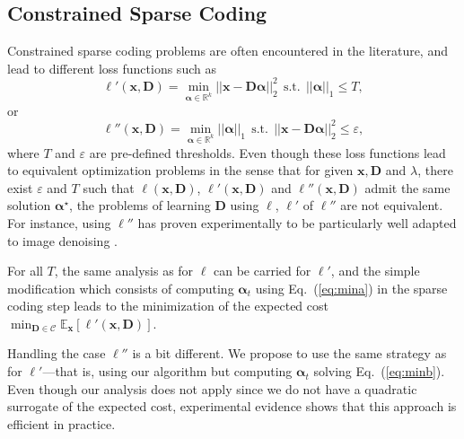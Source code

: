 \documentclass[twoside,11pt]{article}
\def\x{{\mathbf x}}
\def\l{{\ell}}
\def\alphab{{\boldsymbol\alpha}}
\def\D{{\mathbf D}}
\def\E{{\mathbb E}}
\def\C{{\mathcal C}}
\def\Real{{\mathbb R}}
\def\st{~~\text{s.t.}~~}
\begin{document}
\subsection{Constrained Sparse Coding}
Constrained sparse coding problems are often encountered in the literature, and lead to 
different loss functions such as
\begin{equation}
   \l'(\x,\D) = \min_{\alphab \in \Real^k} ||\x-\D\alphab||_2^2 \st
   ||\alphab||_1 \leq T, \label{eq:mina}
\end{equation}
or
\begin{equation}
   \l''(\x,\D) = \min_{\alphab \in \Real^k}  ||\alphab||_1  \st
   ||\x-\D\alphab||_2^2 \leq \varepsilon, \label{eq:minb}
\end{equation}
where $T$ and $\varepsilon$ are pre-defined thresholds. 
Even though these loss functions lead to equivalent optimization problems 
in the sense that for given $\x,\D$ and $\lambda$, there exist $\varepsilon$ and
$T$ such that $\l(\x,\D)$, $\l'(\x,\D)$ and $\l''(\x,\D)$ admit
the same solution $\alphab^\star$, the problems of learning $\D$ using $\l$,
$\l'$ of $\l''$ are not equivalent. For instance, using $\l''$ has proven
experimentally to be particularly well adapted to image denoising \citep{elad,mairal}. 

For all $T$, the same analysis as for $\l$ can be carried for $\l'$, and the
simple modification which consists of computing $\alphab_t$ using
Eq.~(\ref{eq:mina}) in the sparse coding step leads to the minimization of the
expected cost $\min_{\D \in \C} \E_{\x}[\l'(\x,\D)]$.

Handling the case $\l''$ is a bit different. We propose to use the same
strategy as for $\l'$---that is, using our algorithm but computing $\alphab_t$
solving Eq.~(\ref{eq:minb}). Even though our analysis does not apply
since we do not have a quadratic surrogate of the expected cost,
experimental evidence shows that this approach is efficient in practice.
\end{document}
